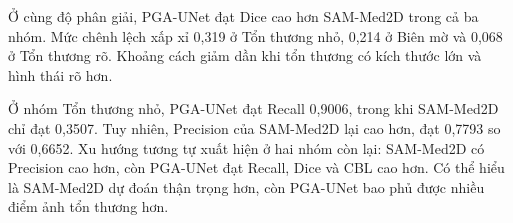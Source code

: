 \begin{table}[H]
    \centering
    \caption{So sánh PGA-UNet với SAM-Med2D theo đặc tính tổn thương ở cùng độ phân giải $256\times256$ trên FracAtlas (Bao trọn, 24 ảnh/nhóm)}
    \label{tab:fracatlas_subcat_sam_256}
    \renewcommand{\arraystretch}{1.3}
\end{table}

Ở cùng độ phân giải, PGA-UNet đạt Dice cao hơn SAM-Med2D trong cả ba nhóm. Mức chênh lệch xấp xỉ 0,319 ở Tổn thương nhỏ, 0,214 ở Biên mờ và 0,068 ở Tổn thương rõ. Khoảng cách giảm dần khi tổn thương có kích thước lớn và hình thái rõ hơn.

Ở nhóm Tổn thương nhỏ, PGA-UNet đạt Recall 0,9006, trong khi SAM-Med2D chỉ đạt 0,3507. Tuy nhiên, Precision của SAM-Med2D lại cao hơn, đạt 0,7793 so với 0,6652. Xu hướng tương tự xuất hiện ở hai nhóm còn lại: SAM-Med2D có Precision cao hơn, còn PGA-UNet đạt Recall, Dice và CBL cao hơn. Có thể hiểu là SAM-Med2D dự đoán thận trọng hơn, còn PGA-UNet bao phủ được nhiều điểm ảnh tổn thương hơn.

